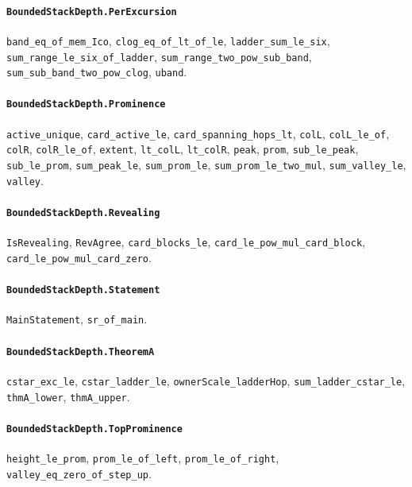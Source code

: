 \paragraph{\texttt{BoundedStackDepth.PerExcursion}}
{\small\raggedright \texttt{band\_eq\_of\_mem\_Ico}, \texttt{clog\_eq\_of\_lt\_of\_le}, \texttt{ladder\_sum\_le\_six}, \texttt{sum\_range\_le\_six\_of\_ladder}, \texttt{sum\_range\_two\_pow\_sub\_band}, \texttt{sum\_sub\_band\_two\_pow\_clog}, \texttt{uband}.\par}

\paragraph{\texttt{BoundedStackDepth.Prominence}}
{\small\raggedright \texttt{active\_unique}, \texttt{card\_active\_le}, \texttt{card\_spanning\_hops\_lt}, \texttt{colL}, \texttt{colL\_le\_of}, \texttt{colR}, \texttt{colR\_le\_of}, \texttt{extent}, \texttt{lt\_colL}, \texttt{lt\_colR}, \texttt{peak}, \texttt{prom}, \texttt{sub\_le\_peak}, \texttt{sub\_le\_prom}, \texttt{sum\_peak\_le}, \texttt{sum\_prom\_le}, \texttt{sum\_prom\_le\_two\_mul}, \texttt{sum\_valley\_le}, \texttt{valley}.\par}

\paragraph{\texttt{BoundedStackDepth.Revealing}}
{\small\raggedright \texttt{IsRevealing}, \texttt{RevAgree}, \texttt{card\_blocks\_le}, \texttt{card\_le\_pow\_mul\_card\_block}, \texttt{card\_le\_pow\_mul\_card\_zero}.\par}

\paragraph{\texttt{BoundedStackDepth.Statement}}
{\small\raggedright \texttt{MainStatement}, \texttt{sr\_of\_main}.\par}

\paragraph{\texttt{BoundedStackDepth.TheoremA}}
{\small\raggedright \texttt{cstar\_exc\_le}, \texttt{cstar\_ladder\_le}, \texttt{ownerScale\_ladderHop}, \texttt{sum\_ladder\_cstar\_le}, \texttt{thmA\_lower}, \texttt{thmA\_upper}.\par}

\paragraph{\texttt{BoundedStackDepth.TopProminence}}
{\small\raggedright \texttt{height\_le\_prom}, \texttt{prom\_le\_of\_left}, \texttt{prom\_le\_of\_right}, \texttt{valley\_eq\_zero\_of\_step\_up}.\par}

